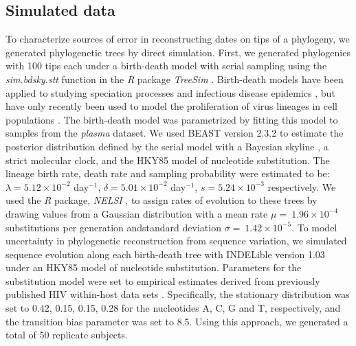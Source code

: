 \documentclass[12pt]{article}
\begin{document}
\subsection*{Simulated data}
To characterize sources of error in reconstructing dates on tips of a phylogeny, we generated phylogenetic trees by direct simulation. %
First, we generated phylogenies with 100 tips each under a birth-death model with serial sampling using the \emph{sim.bdsky.stt} function in the \textit{R} package \textit{TreeSim} \cite{Boskova14}.
Birth-death models have been applied to studying speciation processes \cite{Nee06} and infectious disease epidemics \cite{Stradler13}, but have only recently been used to model the proliferation of virus lineages in cell populations \cite{Hartfield15}.
The birth-death model was parametrized by fitting this model to samples from the {\em plasma} dataset.
We used BEAST version 2.3.2 \cite{BEAST2} to estimate the posterior distribution defined by the serial model with a Bayesian skyline \cite{Stadler13}, a strict molecular clock, and the HKY85 \cite{HKY85} model of nucleotide substitution.
The lineage birth rate, death rate and sampling probability were estimated to be: $\lambda = 5.12 \times 10^{-2}$ day$^{-1}$, $\delta = 5.01 \times 10^{-2}$ day$^{-1}$, $s = 5.24 \times 10^{-3}$ respectively.
We used the \textit{R} package, \emph{NELSI} \cite{NELSI}, to assign rates of evolution to these trees by drawing values from a Gaussian distribution with a mean rate $\mu = \ 1.96\times 10^{-4}$ substitutions per generation andstandard deviation $\sigma = \ 1.42\times 10^{-5}$. %
To model uncertainty in phylogenetic reconstruction from sequence variation, we simulated sequence evolution along each birth-death tree with INDELible version 1.03 \cite{Indelible} under an HKY85 \cite{HKY85} model of nucleotide substitution.
Parameters for the substitution model were set to empirical estimates derived from previously published HIV within-host data sets \cite{McCloskey14}. 
Specifically, the stationary distribution was set to 0.42, 0.15, 0.15, 0.28 for the nucleotides A, C, G and T, respectively, and the transition bias parameter was set to 8.5.
Using this approach, we generated a total of 50 replicate subjects.
\end{document}

